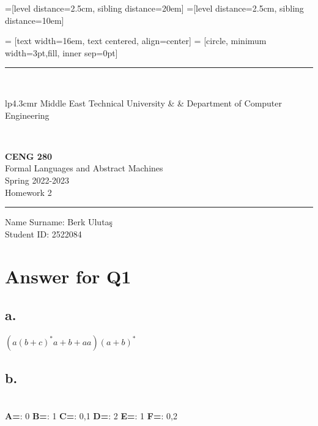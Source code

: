 \documentclass[12pt]{article}
\newcommand{\HRule}{\rule{\linewidth}{1mm}}
\begin{document}
=[level distance=2.5cm, sibling distance=20em]
=[level distance=2.5cm, sibling distance=10em]

 = [text width=16em, text centered, align=center]
 = [circle, minimum width=3pt,fill, inner sep=0pt]

\noindent
\HRule \\[3mm]
\small
\begin{tabular}[b]{lp{4.3cm}r}
Middle East Technical University &  &
Department of Computer Engineering \\
\end{tabular} \\
\begin{center}

                 \LARGE \textbf{CENG 280} \\[4mm]
                 \Large Formal Languages and Abstract Machines \\[4mm]
                \normalsize Spring 2022-2023 \\
                    \Large Homework 2 \\
\end{center}
\HRule



\begin{center}
Name Surname: Berk Ulutaş  \\
Student ID: 2522084
\end{center}



\section*{Answer for Q1}

\subsection*{a.} 
$(a(b+c)^*a + b + aa)(a+b)^*$
 
\subsection*{b.}    \hfill\\
\textbf{A=}:  0      \newline
\textbf{B=}:  1      \newline
\textbf{C=}:  0,1      \newline
\textbf{D=}:   2     \newline
\textbf{E=}:    1    \newline
\textbf{F=}:   0,2     
\end{document}
